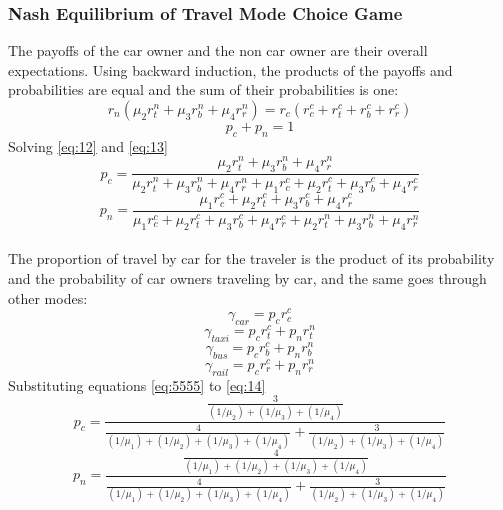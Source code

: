 \subsubsection{Nash Equilibrium of Travel Mode Choice Game}
The payoffs of the car owner and the non car owner are their overall expectations. Using backward induction, the products of the payoffs and probabilities are equal and the sum of their probabilities is one: 
\begin{equation}\label{eq:12}
r_n(\mu_2 r^n_{t} + \mu_3 r^n_{b} + \mu_4 r^n_{r}) =  r_c(r^c_{c} + r^{c}_{t} + r^c_{b} + r^c_{r})
\end{equation}
\begin{equation}\label{eq:13}
p_c + p_n = 1
\end{equation}
Solving \ref{eq:12} and \ref{eq:13}
\begin{equation}
p_c = \frac{\mu_2 r^n_{t} + \mu_3 r^n_{b} + \mu_4 r^n_{r}}{\mu_2 r^n_{t} + \mu_3 r^n_{b} + \mu_4 r^n_{r} + \mu_1 r^c_{c} +  \mu_2 r^{c}_{t} + \mu_3 r^c_{b} + \mu_4 r^c_{r}}
\end{equation}
\begin{equation}
p_n = \frac{\mu_1 r^c_{c} +  \mu_2 r^{c}_{t} + \mu_3 r^c_{b} + \mu_4 r^c_{r}}{\mu_1 r^c_{c} +  \mu_2 r^{c}_{t} + \mu_3 r^c_{b} + \mu_4 r^c_{r} + \mu_2 r^n_{t} + \mu_3 r^n_{b} + \mu_4 r^n_{r}}
\end{equation}
\paragraph{}The proportion of travel by car for the traveler is the product of its probability and the probability of car owners traveling by car, and the same goes through other modes:  
\begin{equation}\label{eq:14}
\gamma_{car} = p_c r^c_c
\end{equation}
\begin{equation}
\gamma_{taxi} = p_c r^c_t + p_n r^n_t
\end{equation}
\begin{equation}
\gamma_{bus} = p_c r^c_b + p_n r^n_b
\end{equation}
\begin{equation}\label{eq:15}
\gamma_{rail} = p_c r^c_r + p_n r^n_r
\end{equation}
Substituting equations \ref{eq:5555} to \ref{eq:14}
\begin{equation}
p_{c} = \frac{\frac{3}{(1/\mu_2)+(1/\mu_3)+(1/\mu_4)}}{\frac{4}{(1/\mu_1)+(1/\mu_2)+(1/\mu_3)+(1/\mu_4)}+\frac{3}{(1/\mu_2)+(1/\mu_3)+(1/\mu_4)}}
\end{equation}
\begin{equation}
p_n{} = \frac{\frac{4}{(1/\mu_1)+(1/\mu_2)+(1/\mu_3)+(1/\mu_4)}}{\frac{4}{(1/\mu_1)+(1/\mu_2)+(1/\mu_3)+(1/\mu_4)}+\frac{3}{(1/\mu_2)+(1/\mu_3)+(1/\mu_4)}}
\end{equation}
